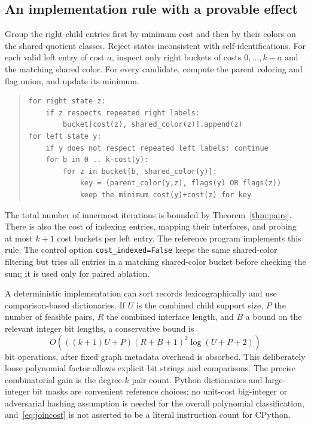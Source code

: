 \documentclass[11pt,a4paper]{article}
\theoremstyle{definition}
\theoremstyle{remark}
\newcommand{\code}[1]{\nolinkurl{#1}}
\begin{document}
\subsection{An implementation rule with a provable effect}
Group the right-child entries first by minimum cost and then by their colors on the shared quotient classes. Reject states inconsistent with self-identifications. For each valid left entry of cost $a$, inspect only right buckets of costs $0,\ldots,k-a$ and the matching shared color. For every candidate, compute the parent coloring and flag union, and update its minimum.

\begin{quote}\small
\begin{minipage}{\linewidth}
\begin{verbatim}
for right state z:
    if z respects repeated right labels:
        bucket[cost(z), shared_color(z)].append(z)
for left state y:
    if y does not respect repeated left labels: continue
    for b in 0 .. k-cost(y):
        for z in bucket[b, shared_color(y)]:
            key = (parent_color(y,z), flags(y) OR flags(z))
            keep the minimum cost(y)+cost(z) for key
\end{verbatim}
\end{minipage}
\end{quote}
The total number of innermost iterations is bounded by Theorem~\ref{thm:pairs}. There is also the cost of indexing entries, mapping their interfaces, and probing at most $k+1$ cost buckets per left entry. The reference program implements this rule. The control option \code{cost_indexed=False} keeps the same shared-color filtering but tries all entries in a matching shared-color bucket before checking the sum; it is used only for paired ablation.

A deterministic implementation can sort records lexicographically and use comparison-based dictionaries. If $U$ is the combined child support size, $P$ the number of feasible pairs, $R$ the combined interface length, and $B$ a bound on the relevant integer bit lengths, a conservative bound is
\[
 O\!\left(((k+1)U+P)(R+B+1)^2
       \log(U+P+2)\right)
 \tag{5}\label{eq:joincost}
\]
bit operations, after fixed graph metadata overhead is absorbed. This deliberately loose polynomial factor allows explicit bit strings and comparisons. The precise combinatorial gain is the degree-$k$ pair count. Python dictionaries and large-integer bit masks are convenient reference choices; no unit-cost big-integer or adversarial hashing assumption is needed for the overall polynomial classification, and~\eqref{eq:joincost} is not asserted to be a literal instruction count for CPython.
\end{document}
